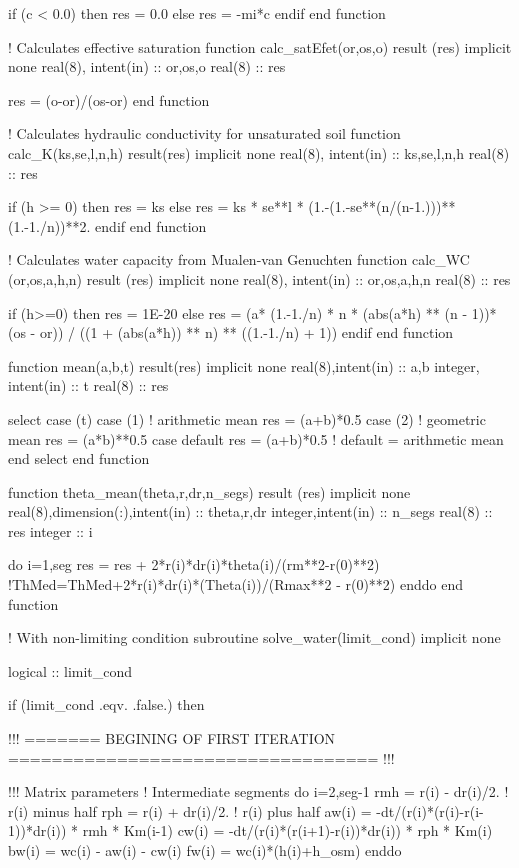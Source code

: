   if (c < 0.0) then
    res = 0.0
  else
    res = -mi*c
  endif
end function

! Calculates effective saturation
function calc_satEfet(or,os,o) result (res)
implicit none
  real(8), intent(in) :: or,os,o
  real(8)	      :: res

  res = (o-or)/(os-or)
end function

! Calculates hydraulic conductivity for unsaturated soil
function calc_K(ks,se,l,n,h) result(res)
implicit none
  real(8), intent(in) :: ks,se,l,n,h
  real(8)	      :: res

  if (h >= 0) then
    res = ks
  else
    res = ks * se**l * (1.-(1.-se**(n/(n-1.)))**(1.-1./n))**2.
  endif
end function

! Calculates water capacity from Mualen-van Genuchten
function calc_WC (or,os,a,h,n) result (res)
implicit none
  real(8), intent(in) :: or,os,a,h,n
  real(8)	      :: res

 if (h>=0) then
    res = 1E-20
 else
    res = (a* (1.-1./n) * n *  (abs(a*h) ** (n - 1))*(os - or)) / ((1 + (abs(a*h)) ** n) ** ((1.-1./n) + 1)) 
 endif
end function

function mean(a,b,t) result(res)
implicit none
  real(8),intent(in)         :: a,b
  integer, intent(in)        :: t
  real(8)	             :: res
  
  select case (t) 
  case (1) 		! arithmetic mean
    res = (a+b)*0.5
  case (2)		! geometric mean
    res = (a*b)**0.5
  case default
    res = (a+b)*0.5	! default = arithmetic mean
  end select
end function

function theta_mean(theta,r,dr,n_segs) result (res)
implicit none
  real(8),dimension(:),intent(in) :: theta,r,dr
  integer,intent(in)		  :: n_segs
  real(8)			  :: res
  integer  			  :: i

  do i=1,seg
    res = res + 2*r(i)*dr(i)*theta(i)/(rm**2-r(0)**2)
    !ThMed=ThMed+2*r(i)*dr(i)*(Theta(i))/(Rmax**2 - r(0)**2)
  enddo
end function

! With non-limiting condition
subroutine solve_water(limit_cond)
implicit none
   
   logical :: limit_cond

   if (limit_cond .eqv. .false.) then

    !!! ======= BEGINING OF FIRST ITERATION ================================== !!!
    
    !!! Matrix parameters
    ! Intermediate segments
    do i=2,seg-1
      rmh = r(i) - dr(i)/2.	! r(i) minus half
      rph = r(i) + dr(i)/2.	! r(i) plus half
      aw(i) = -dt/(r(i)*(r(i)-r(i-1))*dr(i)) * rmh * Km(i-1)
      cw(i) = -dt/(r(i)*(r(i+1)-r(i))*dr(i)) * rph * Km(i)
      bw(i) = wc(i) - aw(i) - cw(i)
      fw(i) = wc(i)*(h(i)+h_osm)
    enddo
    
